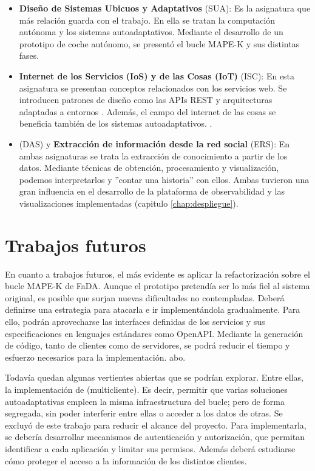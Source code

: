 \begin{itemize}
  \item \textbf{Diseño de Sistemas Ubicuos y Adaptativos} (SUA): Es la asignatura que más relación guarda con el trabajo. En ella se tratan la computación autónoma y los sistemas autoadaptativos. Mediante el desarrollo de un prototipo de coche autónomo, se presentó el bucle MAPE-K y sus distintas fases.

  \item \textbf{Internet de los Servicios (IoS) y de las Cosas (IoT)} (ISC): En esta asignatura se presentan conceptos relacionados con los servicios web. Se introducen patrones de diseño como las APIs REST y arquitecturas adaptadas a entornos . Además, el campo del internet de las cosas se beneficia también de los sistemas autoadaptativos. \cite{savaglioAgentbasedInternetThings2020}.

  \item \textbf{} (DAS) y \textbf{Extracción de información desde la red social} (ERS): En ambas asignaturas se trata la extracción de conocimiento a partir de los datos. Mediante técnicas de obtención, procesamiento y visualización, podemos interpretarlos y ''contar una historia'' con ellos. Ambas tuvieron una gran influencia en el desarrollo de la plataforma de observabilidad y las visualizaciones implementadas (capitulo \ref{chap:despliegue}).

\end{itemize}

\section{Trabajos futuros}

En cuanto a trabajos futuros, el más evidente es aplicar la refactorización sobre el bucle MAPE-K  de FaDA. Aunque el prototipo pretendía ser lo más fiel al sistema original, es posible que surjan nuevas dificultades no contempladas. Deberá definirse una estrategia para atacarla e ir implementándola gradualmente. Para ello, podrán aprovecharse las interfaces definidas de los servicios y sus especificaciones en lenguajes estándares como OpenAPI. Mediante la generación de código, tanto de clientes como de servidores, se podrá reducir el tiempo y esfuerzo necesarios para la implementación. abo.

Todavía quedan algunas vertientes abiertas que se podrían explorar. Entre ellas, la implementación de  (multicliente). \cite{aljahdaliMultitenancyCloudComputing2014} Es decir, permitir que varias soluciones autoadaptativas empleen la misma infraestructura del bucle; pero de forma segregada, sin poder interferir entre ellas o acceder a los datos de otras. Se excluyó de este trabajo para reducir el alcance del proyecto. Para implementarla, se debería desarrollar mecanismos de autenticación y autorización, que permitan identificar a cada aplicación y limitar sus permisos. Además deberá estudiarse cómo proteger el acceso a la información de los distintos clientes.

